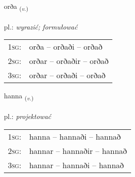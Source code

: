 \documentclass[frontgrid, backgrid]{flacards}\usepackage[]{graphicx}\usepackage[]{xcolor}
\begin{document}
\renewcommand{\flhead}{\vskip5pt \fboxsep=0pt {\small\bfseries\footnotesize Sagnorð | Verb}}
\renewcommand{\fcfoot}{\vskip5pt \fboxsep=0pt \hspace{2pt}{\small\bfseries\footnotesize 2K}}

\renewcommand{\blhead}{\vskip5pt {\small\bfseries\footnotesize Sagnorð | Verb }}
\renewcommand{\bcfoot}{\vskip5pt \hspace{2pt}{\small\bfseries\footnotesize 2K}}


{orða \small{\textsubscript{(\textit{v.})}} \\[1ex] %
\textphonetic{[ɔrða]} \\
pl.: \emph{wyrazić; formułować} \\  [2ex]
\renewcommand*{\arraystretch}{0.8}
\begin{tabular}{p{1cm}l}
\textsc{1sg}: & orða -- orðaði -- orðað \\ 
\textsc{2sg}: & orðar -- orðaðir -- orðað \\ 
\textsc{3sg}: & orðar -- orðaði -- orðað \\ 
\end{tabular}
}

\renewcommand{\flhead}{\vskip5pt \fboxsep=0pt {\small\bfseries\footnotesize Sagnorð | Verb}}
\renewcommand{\fcfoot}{\vskip5pt \fboxsep=0pt \hspace{2pt}{\small\bfseries\footnotesize 2K}}

\renewcommand{\blhead}{\vskip5pt {\small\bfseries\footnotesize Sagnorð | Verb }}
\renewcommand{\bcfoot}{\vskip5pt \hspace{2pt}{\small\bfseries\footnotesize 2K}}


{hanna \small{\textsubscript{(\textit{v.})}} \\[1ex] %
\textphonetic{[hana]} \\
pl.: \emph{projektować} \\  [2ex]
\renewcommand*{\arraystretch}{0.8}
\begin{tabular}{p{1cm}l}
\textsc{1sg}: & hanna -- hannaði -- hannað \\ 
\textsc{2sg}: & hannar -- hannaðir -- hannað \\ 
\textsc{3sg}: & hannar -- hannaði -- hannað \\ 
\end{tabular}
}
\end{document}
